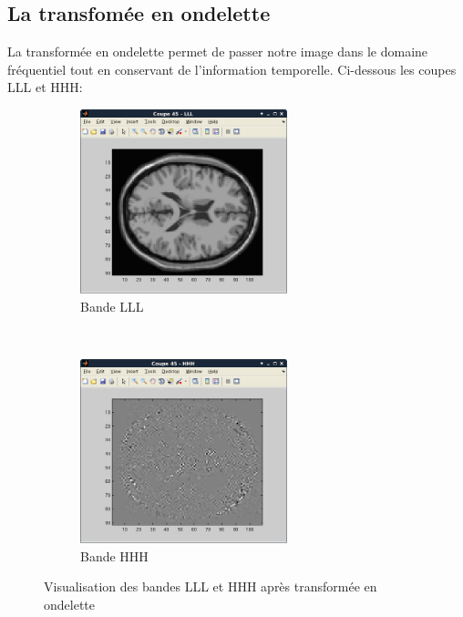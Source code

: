 \documentclass{report}
\begin{document}
\subsection{La transfomée en ondelette}
La transformée en ondelette permet de passer notre image dans le domaine fréquentiel tout en conservant de l'information temporelle. Ci-dessous les coupes LLL et HHH:
\begin{figure}[h]
\centering
	\begin{subfigure}[h]{0.42\textwidth}
	\centering
	\includegraphics[width = 6cm]{coupe45LLL.png}
	\caption{Bande LLL}
	\end{subfigure}
	~	
	\begin{subfigure}[h]{0.42\textwidth}
	\centering
	\includegraphics[width = 6cm]{coupe45HHH.png}
	\caption{Bande HHH}
	\end{subfigure}
	\caption{Visualisation des bandes LLL et HHH après transformée en ondelette}
\end{figure}
\end{document}
